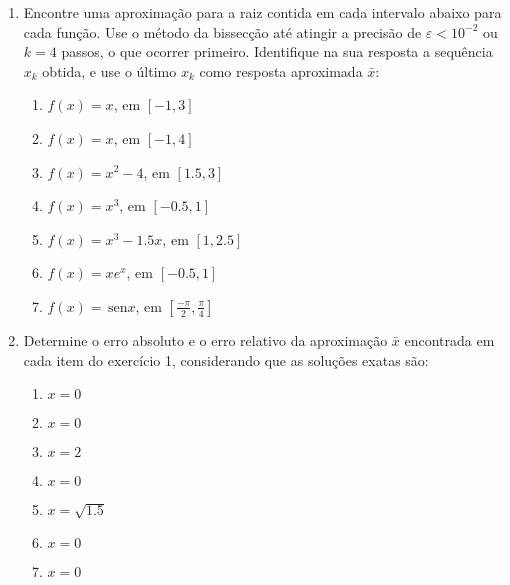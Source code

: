 \documentclass[a4paper]{article}
\providecommand{\sin}{} \renewcommand{\sin}{\hspace{2pt}\mathrm{sen}}
\begin{document}
\begin{enumerate}
\item Encontre uma aproximação para a raiz contida em cada intervalo
  abaixo para cada função. Use o método da bissecção até atingir a
  precisão de $\varepsilon<10^{-2}$ ou $k=4$ passos, o que ocorrer
  primeiro. Identifique na sua resposta a sequência $x_k$ obtida, e
  use o último $x_k$ como resposta aproximada $\bar{x}$:

  \begin{enumerate}
  \item $f(x) = x$, em $[-1, 3]$
  \item $f(x) = x$, em $[-1, 4]$
  \item $f(x) = x^2 - 4$, em $[1.5, 3]$
  \item $f(x) = x^3$, em $[-0.5, 1]$
  \item $f(x) = x^3-1.5x$, em $[1, 2.5]$
  \item $f(x) = x e^x$, em $[-0.5, 1]$
  \item $f(x) = \sin x$, em
    $\left[\frac{-\pi}{2},\frac{\pi}{4}\right]$
  \end{enumerate}

\item Determine o erro absoluto e o erro relativo da aproximação
  $\bar{x}$ encontrada em cada item do exercício 1, considerando que
  as soluções exatas são:
  \begin{enumerate}
  \item $x=0$ %
  \item $x=0$ %
  \item $x=2$ %
  \item $x=0$ %
  \item $x=\sqrt{1.5}$ %
  \item $x=0$ %
  \item $x=0$ %
  \end{enumerate}



\end{enumerate}
\end{document}
